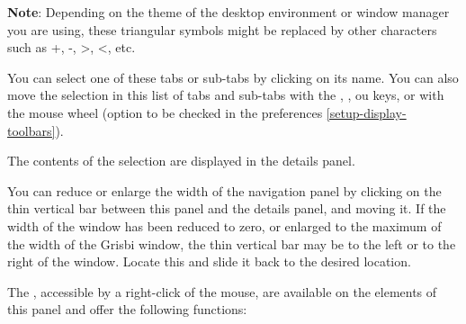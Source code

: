 \textbf{Note}: Depending on the theme of the desktop environment or window manager you are using, these triangular symbols might be replaced by other characters such as +, -, >, <, etc.


You can select one of these tabs or sub-tabs by clicking on its name. You can also move the selection in this list of tabs and sub-tabs with the , ,  ou  keys, or with the mouse wheel (option to be checked in the preferences \vref{setup-display-toolbars}). 

The contents of the selection are displayed in the details panel.

You can reduce or enlarge the width of the navigation panel by clicking on the thin vertical bar between this panel and the details panel, and moving it. If the width of the window has been reduced to zero, or enlarged to the maximum of the width of the Grisbi window, the thin vertical bar may be to the left or to the right of the window.  Locate this and slide it back to the desired location.


The , accessible by a right-click of the mouse, are available on the elements of this panel and offer the following functions:

